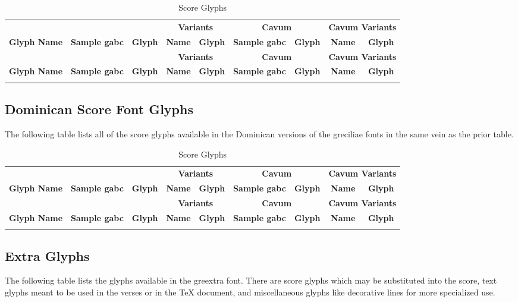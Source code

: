 \begin{landscape}
\newcommand\ScoreFontTable[1]{%
  \begin{longtable}{llc|cc|lc|cc}
      \caption{Score Glyphs}\\
      &
      &%
      &%
      \multicolumn{2}{c|}{\bfseries Variants}&
      \multicolumn{2}{c|}{\bfseries Cavum}&
      \multicolumn{2}{c}{\bfseries Cavum Variants}\\
      \hhline{>{\arrayrulecolor{lightgray}}--->{\arrayrulecolor{black}}------}
      {\bfseries Glyph Name}&%
      {\scriptsize\bfseries Sample gabc}&%
      {\scriptsize\bfseries Glyph}&%
      {\scriptsize\bfseries Name}&%
      {\scriptsize\bfseries Glyph}&%
      {\scriptsize\bfseries Sample gabc}&%
      {\scriptsize\bfseries Glyph}&%
      {\scriptsize\bfseries Name}&%
      {\scriptsize\bfseries Glyph}\\
      \hline
    \endfirsthead
      &%
      &%
      &%
      \multicolumn{2}{c|}{\bfseries Variants}&
      \multicolumn{2}{c|}{\bfseries Cavum}&
      \multicolumn{2}{c}{\bfseries Cavum Variants}\\
      \hhline{>{\arrayrulecolor{lightgray}}--->{\arrayrulecolor{black}}------}
      {\bfseries Glyph Name}&%
      {\scriptsize\bfseries Sample gabc}&%
      {\scriptsize\bfseries Glyph}&%
      {\scriptsize\bfseries Name}&%
      {\scriptsize\bfseries Glyph}&%
      {\scriptsize\bfseries Sample gabc}&%
      {\scriptsize\bfseries Glyph}&%
      {\scriptsize\bfseries Name}&%
      {\scriptsize\bfseries Glyph}\\
      \hline
    \endhead
    \directlua{GregorioRef.emit_score_glyphs(#1)}
  \end{longtable}
}%
\ScoreFontTable{'greciliae', 'greciliaeHollow'}

\subsection{Dominican Score Font Glyphs}

The following table lists all of the score glyphs available in the Dominican
versions of the greciliae fonts in the same vein as the prior table.

\ScoreFontTable{'greciliaeOp', 'greciliaeOpHollow'}

\subsection{Extra Glyphs}\label{subsec:greextra}

The following table lists the glyphs available in the greextra font.  There are
score glyphs which may be substituted into the score, text glyphs meant to be
used in the verses or in the \TeX{} document, and miscellaneous glyphs like
decorative lines for more specialized use.


\end{landscape}
